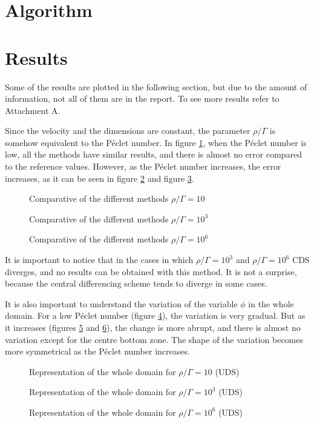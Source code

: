 \section{Algorithm}

\section{Results}
Some of the results are plotted in the following section, but due to the amount of information, not all of them are in the report. To see more results refer to Attachment A.

Since the velocity and the dimensions are constant, the parameter $\rho/\Gamma$ is somehow equivalent to the Péclet number. In figure \ref{ResSH10}, when the Péclet number is low, all the methods have similar results, and there is almost no error compared to the reference values. However, as the Péclet number increases, the error increases, as it can be seen in figure \ref{ResSH1000} and figure \ref{ResSH1000000}.

\begin{figure}
	\centering
	
	\caption{Comparative of the different methods $\rho/\Gamma=10$}
	\label{ResSH10}
\end{figure}
\begin{figure}
	\centering
	
	\caption{Comparative of the different methods $\rho/\Gamma=10^{3}$}
	\label{ResSH1000}
\end{figure}
\begin{figure}
	\centering
	
	\caption{Comparative of the different methods $\rho/\Gamma=10^{6}$}
	\label{ResSH1000000}
\end{figure}
It is important to notice that in the cases in which $\rho/\Gamma=10^{3}$ and $\rho/\Gamma=10^{6}$ CDS diverges, and no results can be obtained with this method. It is not a surprise, because the central differencing scheme tends to diverge in some cases.

It is also important to understand the variation of the variable $\phi$ in the whole domain. For a low Péclet number (figure \ref{ResuSH10}), the variation is very gradual. But as it increases (figures \ref{ResuSH1000} and \ref{ResuSH1000000}), the change is more abrupt, and there is almost no variation except for the centre bottom zone. The shape of the variation becomes more symmetrical as the Péclet number increases.
\begin{figure}
	\centering
	
	\caption{Representation of the whole domain for $\rho/\Gamma=10$ (UDS)}
	\label{ResuSH10}
\end{figure}
\begin{figure}
	\centering
	
	\caption{Representation of the whole domain for $\rho/\Gamma=10^{3}$ (UDS)}
	\label{ResuSH1000}
\end{figure}
\begin{figure}
	\centering
	
	\caption{Representation of the whole domain for $\rho/\Gamma=10^{6}$ (UDS)}
	\label{ResuSH1000000}
\end{figure}

